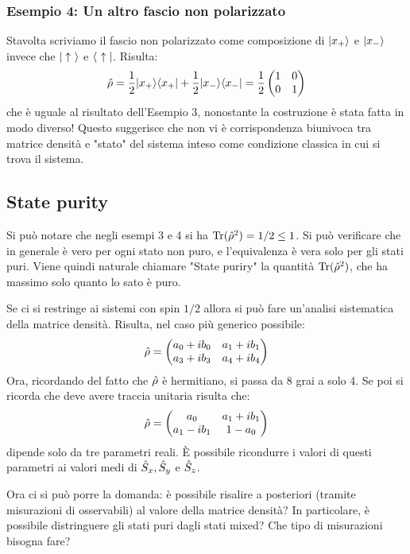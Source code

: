 \subsubsection*{Esempio 4: Un altro fascio non polarizzato}
Stavolta scriviamo il fascio non polarizzato come composizione di $\Ket {x_+}$ e $\Ket {x_-}$ invece che $\Up$ e $\Pu$. Risulta:
\[
    \hat \rho = \half \ketbrabra{x_+} + \half \ketbrabra{x_-} = \half \begin{pmatrix}
        1 & 0 \\
        0 & 1 \\
    \end{pmatrix}
\]
che è uguale al risultato dell'Esempio 3, nonostante la costruzione è stata fatta in modo diverso! Questo suggerisce che non vi è corrispondenza biunivoca tra matrice densità e "stato" del sistema inteso come condizione classica in cui si trova il sistema.

\subsection{State purity}
Si può notare che negli esempi 3 e 4 si ha $\Tr(\hr^2) = 1/2 \leq 1$. Si può verificare che in generale è vero per ogni stato non puro, e l'equivalenza è vera solo per gli stati puri. Viene quindi naturale chiamare "State puriry" la quantità $\Tr(\hr^2)$, che ha massimo solo quanto lo sato è puro.
\tab

Se ci si restringe ai sistemi con spin $1/2$ allora si può fare un'analisi sistematica della matrice densità. Risulta, nel caso più generico possibile:
\[
    \hr = \begin{pmatrix}
        a_0 + ib_0 & a_1 + ib_1 \\
        a_3 + ib_3 & a_4 + ib_4 \\
    \end{pmatrix}
\]
Ora, ricordando del fatto che $\hr$ è hermitiano, si passa da 8 grai a solo 4. Se poi si ricorda che deve avere traccia unitaria risulta che:
\[
    \hr = \begin{pmatrix}
        a_0 & a_1 + ib_1 \\
        a_1 - ib_1 & 1 - a_0 \\
    \end{pmatrix}
\]
dipende solo da tre parametri reali. È possibile ricondurre i valori di questi parametri ai valori medi di $\SG{x}, \SG{y}$ e $\SG{z}$.
\tab

Ora ci si può porre la domanda: è possibile risalire a posteriori (tramite misurazioni di osservabili) al valore della matrice densità? In particolare, è possibile distringuere gli stati puri dagli stati mixed? Che tipo di misurazioni bisogna fare?

